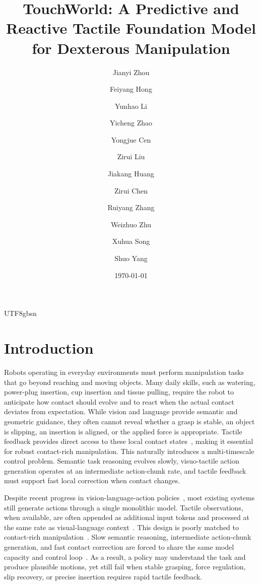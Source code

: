 \documentclass[]{mpai_report}
\title{TouchWorld: A Predictive and Reactive Tactile Foundation Model for Dexterous Manipulation}
\author[1,2*]{Jianyi Zhou}
\author[1,2*]{Feiyang Hong}
\author[1,2*]{Yunhao Li}
\author[1,2]{Yicheng Zhao}
\author[1,2]{Yongjue Cen}
\author[1,2]{Zirui Liu}
\author[1,2]{Jiakang Huang}
\author[1,2]{Zirui Chen}
\author[1,2]{Ruiyang Zhang}
\author[1,2]{Weizhuo Zhu}
\author[1,2]{Xuhua Song}
\author[1,2\text{\ding{41}}]{Shuo Yang}
\affiliation[1]{Harbin Institute of Technology, Shenzhen}
\affiliation[2]{PHANES AI}
\date{\today}
\begin{document}
\begin{CJK*}{UTF8}{gbsn}

\maketitle

\section{Introduction}
Robots operating in everyday environments must perform manipulation tasks that go beyond reaching and moving objects.
Many daily skills, such as watering, power-plug insertion, cup insertion and tissue pulling, require the robot to anticipate how contact should evolve and to react when the actual contact deviates from expectation.
While vision and language provide semantic and geometric guidance, they often cannot reveal whether a grasp is stable, an object is slipping, an insertion is aligned, or the applied force is appropriate.
Tactile feedback provides direct access to these local contact states~\cite{zhao2025touchbeginsvisionends,huang2026spatiallyanchoredtactileawareness,zhang2025tavlaelucidatingdesignspace,yuan2026vtamvideotactileactionmodelscomplex,huang2025tactilevlaunlockingvisionlanguageactionmodels,zheng2026omnivtavisuotactileworldmodeling}, making it essential for robust contact-rich manipulation.
This naturally introduces a multi-timescale control problem.
Semantic task reasoning evolves slowly, visuo-tactile action generation operates at an intermediate action-chunk rate, and tactile feedback must support fast local correction when contact changes.

Despite recent progress in vision-language-action policies~\cite{black2026pi0visionlanguageactionflowmodel,intelligence2025pi05visionlanguageactionmodelopenworld,nvidia2025gr00tn1openfoundation,zheng2026egoscalescalingdexterousmanipulation,liu2025rdt1bdiffusionfoundationmodel,wang2026qwenvlaunifyingvisionlanguageactionmodeling,intelligence2026pi07steerablegeneralistrobotic,kim2024openvla,kim2025finetuningvisionlanguageactionmodelsoptimizing,dai2026conlacontrastivelatentaction,intelligence2025pi06vlalearnsexperience}, most existing systems still generate actions through a single monolithic model.
Tactile observations, when available, are often appended as additional input tokens and processed at the same rate as visual-language context~\cite{yuan2026ftp1generalistfoundationtactile}.
This design is poorly matched to contact-rich manipulation~\cite{xue2025reactivediffusionpolicyslowfast,xue2026tube}.
Slow semantic reasoning, intermediate action-chunk generation, and fast contact correction are forced to share the same model capacity and control loop~\cite{zhao2023learningfinegrainedbimanualmanipulation,chi2025diffusion}.
As a result, a policy may understand the task and produce plausible motions, yet still fail when stable grasping, force regulation, slip recovery, or precise insertion requires rapid tactile feedback.


\end{CJK*}
\end{document}
